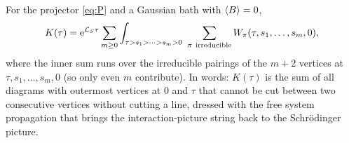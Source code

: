 \begin{theorem}[NZ kernel $=$ irreducible diagrams]\label{thm:irreducible}
For the projector \eqref{eq:P} and a Gaussian bath with $\langle B\rangle=0$,
\begin{equation}
  K(\tau)=\ee^{\Lc_S\tau}\sum_{m\ge0}\int_{\tau>s_1>\dots>s_m>0}\ \sum_{\pi\ \mathrm{irreducible}}W_\pi(\tau,s_1,\dots,s_m,0),
  \label{eq:K-irred}
\end{equation}
where the inner sum runs over the irreducible pairings of the $m+2$ vertices at $\tau,s_1,\dots,s_m,0$ (so only even $m$ contribute).
In words: $K(\tau)$ is the sum of all diagrams with outermost vertices at $0$ and $\tau$ that cannot be cut between two consecutive vertices without cutting a line, dressed with the free system propagation that brings the interaction-picture string back to the Schr\"odinger picture.
\end{theorem}

